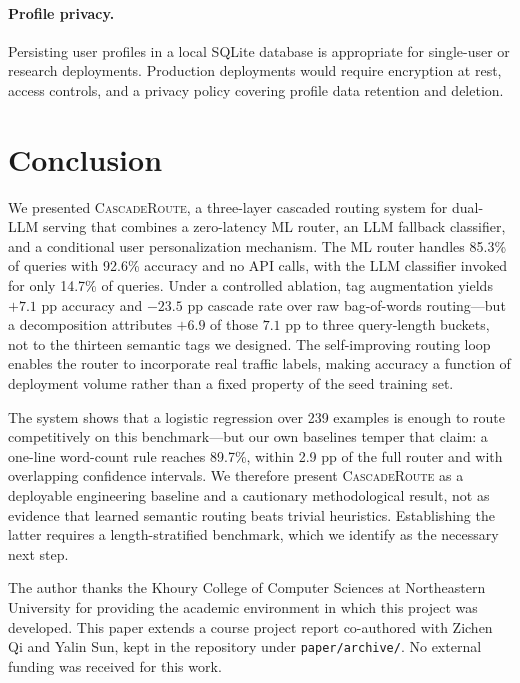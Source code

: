 \documentclass{article}
\newcommand{\system}{\textsc{CascadeRoute}}
\begin{document}
\paragraph{Profile privacy.}
Persisting user profiles in a local SQLite database is appropriate for
single-user or research deployments. Production deployments would require
encryption at rest, access controls, and a privacy policy covering profile
data retention and deletion.

\section{Conclusion}
\label{sec:conclusion}

We presented \system{}, a three-layer cascaded routing system for dual-LLM
serving that combines a zero-latency ML router, an LLM fallback classifier,
and a conditional user personalization mechanism. The ML router handles
85.3\% of queries with 92.6\% accuracy and no API calls, with the LLM
classifier invoked for only 14.7\% of queries. Under a controlled ablation, tag
augmentation yields $+7.1$ pp accuracy and $-23.5$ pp cascade rate over raw
bag-of-words routing---but a decomposition attributes $+6.9$ of those $7.1$ pp
to three query-length buckets, not to the thirteen semantic tags we designed.
The self-improving routing loop enables the router to incorporate real
traffic labels, making accuracy a function of deployment volume rather
than a fixed property of the seed training set.

The system shows that a logistic regression over 239 examples is enough to
route competitively on this benchmark---but our own baselines temper that
claim: a one-line word-count rule reaches 89.7\%, within 2.9 pp of the full
router and with overlapping confidence intervals. We therefore present
\system{} as a deployable engineering baseline and a cautionary methodological
result, not as evidence that learned semantic routing beats trivial heuristics.
Establishing the latter requires a length-stratified benchmark, which we
identify as the necessary next step.


\begin{ack}
The author thanks the Khoury College of Computer Sciences at Northeastern
University for providing the academic environment in which this project was
developed. This paper extends a course project report co-authored with
Zichen Qi and Yalin Sun, kept in the repository under \texttt{paper/archive/}.
No external funding was received for this work.
\end{ack}
\end{document}
